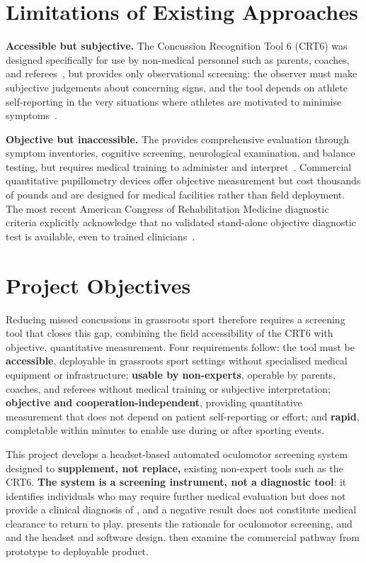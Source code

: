 \section{Limitations of Existing Approaches}
\label{chapter:introduction:limitations}

\textbf{Accessible but subjective.} The Concussion Recognition Tool 6 (CRT6) was designed specifically for use by non-medical personnel such as parents, coaches, and referees~\cite{echemendia2023crt6}, but provides only observational screening: the observer must make subjective judgements about concerning signs, and the tool depends on athlete self-reporting in the very situations where athletes are motivated to minimise symptoms~\cite{meier2015underreporting}.

\noindent\textbf{Objective but inaccessible.} The  provides comprehensive evaluation through symptom inventories, cognitive screening, neurological examination, and balance testing, but requires medical training to administer and interpret~\cite{echemendia2023scat6}. Commercial quantitative pupillometry devices offer objective measurement but cost thousands of pounds and are designed for medical facilities rather than field deployment. The most recent American Congress of Rehabilitation Medicine diagnostic criteria explicitly acknowledge that no validated stand-alone objective diagnostic test is available, even to trained clinicians~\cite{silverberg2023acrm}.


\section{Project Objectives}

Reducing missed concussions in grassroots sport therefore requires a screening tool that closes this gap, combining the field accessibility of the CRT6 with objective, quantitative measurement. Four requirements follow: the tool must be \textbf{accessible}, deployable in grassroots sport settings without specialised medical equipment or infrastructure; \textbf{usable by non-experts}, operable by parents, coaches, and referees without medical training or subjective interpretation; \textbf{objective and cooperation-independent}, providing quantitative measurement that does not depend on patient self-reporting or effort; and \textbf{rapid}, completable within minutes to enable use during or after sporting events.

This project develops a headset-based automated oculomotor screening system designed to \textbf{supplement, not replace,} existing non-expert tools such as the CRT6. \textbf{The system is a screening instrument, not a diagnostic tool}: it identifies individuals who may require further medical evaluation but does not provide a clinical diagnosis of , and a negative result does not constitute medical clearance to return to play.  presents the rationale for oculomotor screening, and  and  the headset and software design.  then examine the commercial pathway from prototype to deployable product.

